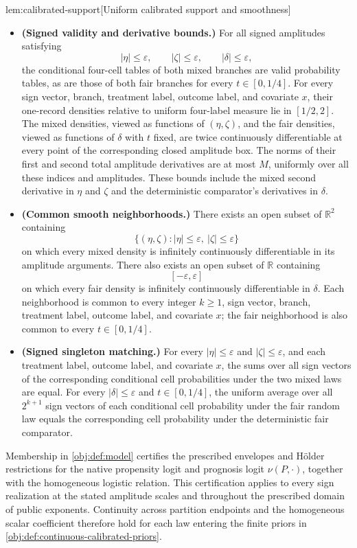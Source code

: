 \begin{lemmav}{lem:calibrated-support}[Uniform calibrated support and smoothness]
\begin{itemize}
\item \textbf{(Signed validity and derivative bounds.)}
For all signed amplitudes satisfying
\[
|\eta|\le\varepsilon,
\qquad
|\zeta|\le\varepsilon,
\qquad
|\delta|\le\varepsilon,
\]
the conditional four-cell tables of both mixed branches are valid probability tables, as are those of both fair branches for every \(t\in[0,1/4]\). For every sign vector, branch, treatment label, outcome label, and covariate \(x\), their one-record densities relative to uniform four-label measure lie in \([1/2,2]\). The mixed densities, viewed as functions of \((\eta,\zeta)\), and the fair densities, viewed as functions of \(\delta\) with \(t\) fixed, are twice continuously differentiable at every point of the corresponding closed amplitude box. The norms of their first and second total amplitude derivatives are at most \(M\), uniformly over all these indices and amplitudes. These bounds include the mixed second derivative in \(\eta\) and \(\zeta\) and the deterministic comparator's derivatives in \(\delta\).

\item \textbf{(Common smooth neighborhoods.)}
There exists an open subset of \(\mathbb R^2\) containing
\[
\{(\eta,\zeta):|\eta|\le\varepsilon,\ |\zeta|\le\varepsilon\}
\]
on which every mixed density is infinitely continuously differentiable in its amplitude arguments. There also exists an open subset of \(\mathbb R\) containing
\[
[-\varepsilon,\varepsilon]
\]
on which every fair density is infinitely continuously differentiable in \(\delta\). Each neighborhood is common to every integer \(k\ge1\), sign vector, branch, treatment label, outcome label, and covariate \(x\); the fair neighborhood is also common to every \(t\in[0,1/4]\).

\item \textbf{(Signed singleton matching.)}
For every \(|\eta|\le\varepsilon\) and \(|\zeta|\le\varepsilon\), and each treatment label, outcome label, and covariate \(x\), the sums over all sign vectors of the corresponding conditional cell probabilities under the two mixed laws are equal. For every \(|\delta|\le\varepsilon\) and \(t\in[0,1/4]\), the uniform average over all \(2^{k+1}\) sign vectors of each conditional cell probability under the fair random law equals the corresponding cell probability under the deterministic fair comparator.
\end{itemize}
\end{lemmav}

Membership in \cref{obj:def:model} certifies the prescribed envelopes and Hölder restrictions for the native propensity logit  and prognosis logit \(\nu(P,\cdot)\), together with the homogeneous logistic relation. This certification applies to every sign realization at the stated amplitude scales and throughout the prescribed domain of public exponents. Continuity across partition endpoints and the homogeneous scalar coefficient therefore hold for each law entering the finite priors in \cref{obj:def:continuous-calibrated-priors}.


